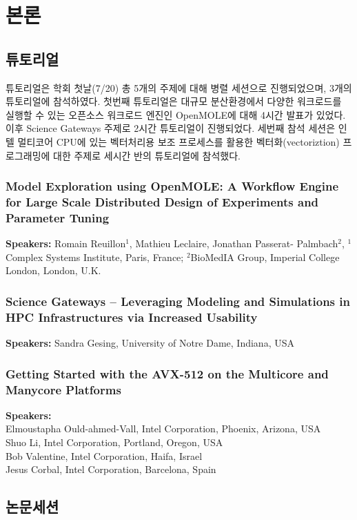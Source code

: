\documentclass[twocolumn]{article}
\begin{document}
\section{본론}

\subsection{튜토리얼}
튜토리얼은 학회 첫날(7/20) 총 5개의 주제에 대해 병렬 세션으로 진행되었으며, 3개의 튜토리얼에 참석하였다.
첫번째 튜토리얼은 대규모 분산환경에서 다양한 워크로드를 실행할 수 있는 오픈소스 워크로드 엔진인 OpenMOLE에 대해 4시간 발표가 있었다.
이후 Science Gateways 주제로 2시간 튜토리얼이 진행되었다. 세번째 참석 세션은 인텔 멀티코어 CPU에 있는 벡터처리용 보조 프로세스를 활용한 벡터화(vectoriztion) 프로그래밍에 대한 주제로 세시간 반의 튜토리얼에 참석했다.

\subsubsection{Model Exploration using OpenMOLE: A Workflow Engine for Large Scale Distributed Design of Experiments and Parameter Tuning}
\textbf{Speakers:} Romain Reuillon$^1$, Mathieu Leclaire, Jonathan Passerat- Palmbach$^2$, $^1$Complex Systems Institute, Paris, France; $^2$BioMedIA Group, Imperial College London, London, U.K.

\subsubsection{Science Gateways – Leveraging Modeling and Simulations in HPC Infrastructures via Increased Usability}
\textbf{Speakers:} Sandra Gesing, University of Notre Dame, Indiana, USA


\subsubsection{Getting Started with the AVX-512 on the Multicore and Manycore Platforms}
\textbf{Speakers:} \\
Elmoustapha Ould-ahmed-Vall, Intel Corporation, Phoenix, Arizona, USA\\ 
Shuo Li, Intel Corporation, Portland, Oregon, USA\\
Bob Valentine, Intel Corporation, Haifa, Israel\\
Jesus Corbal, Intel Corporation, Barcelona, Spain


\subsection{논문세션}
\end{document}
